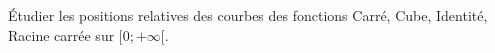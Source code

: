 
Étudier les positions relatives des courbes des fonctions Carré, Cube, Identité, Racine carrée sur $[0;+\infty[$.
 




 

